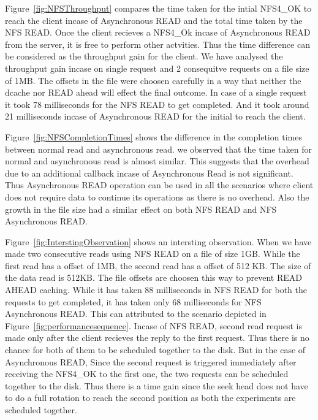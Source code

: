 Figure~\ref{fig:NFSThroughput} compares the  time taken for the intial NFS4\_OK to reach the client incase of Asynchronous READ and the total time taken by the NFS READ.
Once the client recieves a NFS4\_Ok incase of Asynchronous READ from the server, it is free to perform other actvities. Thus the time difference can be considered as the throughput gain for the client. We have analysed the throughput gain incase on single request and 2 consequitve requests on a file size of 1MB. The offsets in the file were choosen carefully in a way that neither the dcache nor READ ahead will effect the final outcome. In case of a single request it took 78 milliseconds for the NFS READ to get completed. And it took around 21 milliseconds incase of Asynchronous READ for the initial   to reach the client. 



	Figure~\ref{fig:NFSCompletionTimes} shows the  difference in the completion times between normal read and asynchronous read. we observed that the time taken for normal and asynchronous read is almost similar. This suggests that the overhead due to an additional callback incase of Asynchronous Read is not significant. Thus Asynchronous READ operation can be used in all the scenarios where client does not require data to continue its operations as there is no overhead. Also the growth in the file size had a similar effect on both NFS READ and NFS Asynchronous READ. 


 Figure~\ref{fig:InterstingObservation} shows an intersting observation. When we have made two consecutive reads  using NFS READ on a file of size 1GB. While the first read has a offset of 1MB, the second read has a offset of 512 KB. The size of the data read is 512KB. The file offsets are choosen this way to prevent READ AHEAD caching. While it has taken 88 milliseconds  in NFS READ for both the requests to get completed, it has taken only 68 milliseconds for NFS Asynchronous READ. This can attributed to the scenario depicted  in   Figure~\ref{fig:performancesequence}. Incase of NFS READ, second read request is made only after the client recieves the reply to the first request. Thus there is no chance for both of them to be scheduled together to the disk. But in the case of Asynchronous READ, Since the second request is triggered immediately after receiving the NFS4\_OK to the first one, the two requests can be scheduled together to the disk. Thus there is a time gain since the seek head does not have to do a full rotation to reach the second position as both the experiments are scheduled together.    


